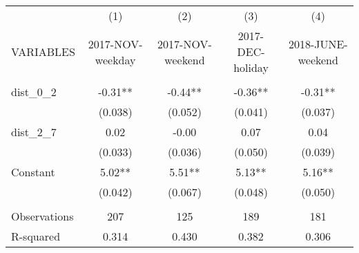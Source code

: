 \begin{tabular}{lcccc} \hline
 & (1) & (2) & (3) & (4) \\
VARIABLES & 2017-NOV-weekday & 2017-NOV-weekend & 2017-DEC-holiday & 2018-JUNE-weekend \\ \hline
 &  &  &  &  \\
dist\_0\_2 & -0.31** & -0.44** & -0.36** & -0.31** \\
 & (0.038) & (0.052) & (0.041) & (0.037) \\
dist\_2\_7 & 0.02 & -0.00 & 0.07 & 0.04 \\
 & (0.033) & (0.036) & (0.050) & (0.039) \\
Constant & 5.02** & 5.51** & 5.13** & 5.16** \\
 & (0.042) & (0.067) & (0.048) & (0.050) \\
 &  &  &  &  \\
Observations & 207 & 125 & 189 & 181 \\
 R-squared & 0.314 & 0.430 & 0.382 & 0.306 \\ \hline
\end{tabular}
